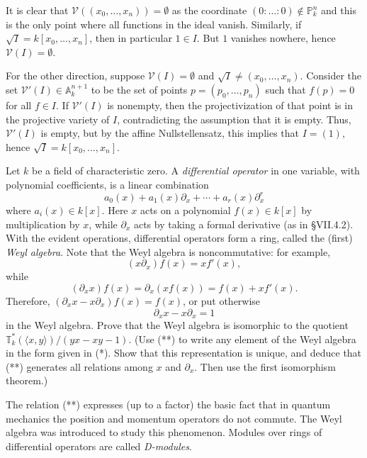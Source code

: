 \documentclass[../../master.tex]{subfiles}
\begin{document}
\begin{solution}
    It is clear that $\mathscr{V}((x_0, \ldots, x_n)) = \emptyset$ as the coordinate $(0 : \ldots : 0) \notin \mathbb{P}_k^{n}$ and this is the only point where all functions in the ideal vanish.
    Similarly, if $\sqrt{I} = k[x_0, \ldots, x_n]$, then in particular $1 \in I$.
    But $1$ vanishes nowhere, hence $\mathscr{V}(I) = \emptyset$.

    For the other direction, suppose $\mathscr{V}(I) = \emptyset$ and $\sqrt{I} \neq (x_0, \ldots, x_n)$.
    Consider the set $\mathscr{V}'(I) \in \mathbb{A}_k^{n+1}$ to be the set of points $p = (p_0, \ldots, p_{n})$ such that $f(p) = 0$ for all $f \in I$.
    If $\mathscr{V}'(I)$ is nonempty, then the projectivization of that point is in the projective variety of $I$, contradicting the assumption that it is empty.
    Thus, $\mathscr{V}'(I)$ is empty, but by the affine Nullstellensatz, this implies that $I = (1)$, hence $\sqrt{I} = k[x_0, \ldots, x_n]$.
\end{solution}

\begin{problem}
    Let $k$ be a field of characteristic zero.
    A \emph{differential operator} in one variable, with polynomial coefficients, is a linear combination
    \[
    \tag{*} a_0(x) + a_1(x) \partial_x + \cdots + a_r(x) \partial_x^{r}
    \]
    where $a_i(x) \in k[x]$.
    Here $x$ acts on a polynomial $f(x) \in k[x]$ by multiplication by $x$, while $\partial_x$ acts by taking a formal derivative (as in \S VII.4.2).
    With the evident operations, differential operators form a ring, called the (first) \textit{Weyl algebra}.
    Note that the Weyl algebra is noncommutative: for example,
    \[
        (x\partial_x) f(x) = x f'(x),
    \]
    while
    \[
        (\partial_x x) f(x) = \partial_x (xf(x)) = f(x) + x f'(x).
    \]
    Therefore, $(\partial_x x - x \partial_x) f(x) = f(x)$, or put otherwise
    \[
    \tag{**} \partial_x x - x \partial_x = 1
    \]
    in the Weyl algebra.
    Prove that the Weyl algebra is isomorphic to the quotient $\mathbb{T}_k^{*}(\langle x, y \rangle) / (yx - xy - 1)$.
    (Use ({**}) to write any element of the Weyl algebra in the form given in (*).
    Show that this representation is unique, and deduce that (**) generates all relations among $x$ and $\partial_x$.
    Then use the first isomorphism theorem.)

    The relation (**) expresses (up to a factor) the basic fact that in quantum mechanics the position and momentum operators do not commute.
    The Weyl algebra was introduced to study this phenomenon.
    Modules over rings of differential operators are called \textit{D-modules}.
\end{problem}
\end{document}
